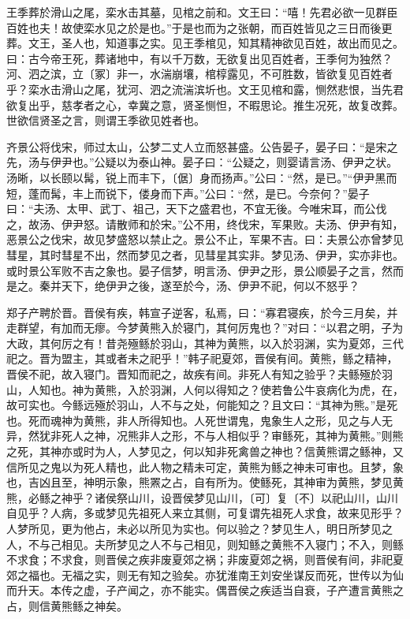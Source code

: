 \documentclass[]{article}
\begin{document}
王季葬於滑山之尾，栾水击其墓，见棺之前和。文王曰：``嘻！先君必欲一见群臣百姓也夫！故使栾水见之於是也。''于是也而为之张朝，而百姓皆见之三日而後更葬。文王，圣人也，知道事之实。见王季棺见，知其精神欲见百姓，故出而见之。曰：古今帝王死，葬诸地中，有以千万数，无欲复出见百姓者，王季何为独然？河、泗之滨，立〔冢〕非一，水湍崩壤，棺椁露见，不可胜数，皆欲复见百姓者乎？栾水击滑山之尾，犹河、泗之流湍滨圻也。文王见棺和露，恻然悲恨，当先君欲复出乎，慈孝者之心，幸冀之意，贤圣恻怛，不暇思论。推生况死，故复改葬。世欲信贤圣之言，则谓王季欲见姓者也。

齐景公将伐宋，师过太山，公梦二丈人立而怒甚盛。公告晏子，晏子曰：``是宋之先，汤与伊尹也。''公疑以为泰山神。晏子曰：``公疑之，则婴请言汤、伊尹之状。汤晰，以长颐以髯，锐上而丰下，〔倨〕身而扬声。''公曰：``然，是已。''``伊尹黑而短，蓬而髯，丰上而锐下，偻身而下声。''公曰：``然，是已。今奈何？''晏子曰：``夫汤、太甲、武丁、祖己，天下之盛君也，不宜无後。今唯宋耳，而公伐之，故汤、伊尹怒。请散师和於宋。''公不用，终伐宋，军果败。夫汤、伊尹有知，恶景公之伐宋，故见梦盛怒以禁止之。景公不止，军果不吉。曰：夫景公亦曾梦见彗星，其时彗星不出，然而梦见之者，见彗星其实非。梦见汤、伊尹，实亦非也。或时景公军败不吉之象也。晏子信梦，明言汤、伊尹之形，景公顺晏子之言，然而是之。秦并天下，绝伊尹之後，遂至於今，汤、伊尹不祀，何以不怒乎？

郑子产聘於晋。晋侯有疾，韩宣子逆客，私焉，曰：``寡君寝疾，於今三月矣，并走群望，有加而无瘳。今梦黄熊入於寝门，其何厉鬼也？''对曰：``以君之明，子为大政，其何厉之有！昔尧殛鲧於羽山，其神为黄熊，以入於羽渊，实为夏郊，三代祀之。晋为盟主，其或者未之祀乎！''韩子祀夏郊，晋侯有间。黄熊，鲧之精神，晋侯不祀，故入寝门。晋知而祀之，故疾有间。非死人有知之验乎？夫鲧殛於羽山，人知也。神为黄熊，入於羽渊，人何以得知之？使若鲁公牛哀病化为虎，在，故可实也。今鲧远殛於羽山，人不与之处，何能知之？且文曰：``其神为熊。''是死也。死而魂神为黄熊，非人所得知也。人死世谓鬼，鬼象生人之形，见之与人无异，然犹非死人之神，况熊非人之形，不与人相似乎？审鲧死，其神为黄熊。''则熊之死，其神亦或时为人，人梦见之，何以知非死禽兽之神也？信黄熊谓之鲧神，又信所见之鬼以为死人精也，此人物之精未可定，黄熊为鲧之神未可审也。且梦，象也，吉凶且至，神明示象，熊罴之占，自有所为。使鲧死，其神审为黄熊，梦见黄熊，必鲧之神乎？诸侯祭山川，设晋侯梦见山川，〔可〕复〔不〕以祀山川，山川自见乎？人病，多或梦见先祖死人来立其侧，可复谓先祖死人求食，故来见形乎？人梦所见，更为他占，未必以所见为实也。何以验之？梦见生人，明日所梦见之人，不与己相见。夫所梦见之人不与己相见，则知鲧之黄熊不入寝门；不入，则鲧不求食；不求食，则晋侯之疾非废夏郊之祸；非废夏郊之祸，则晋侯有间，非祀夏郊之福也。无福之实，则无有知之验矣。亦犹淮南王刘安坐谋反而死，世传以为仙而升天。本传之虚，子产闻之，亦不能实。偶晋侯之疾适当自衰，子产遭言黄熊之占，则信黄熊鲧之神矣。
\end{document}
